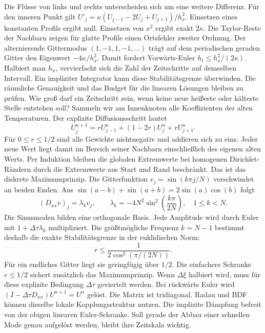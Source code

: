 \hypertarget{punkt7-2-1}{}
Die Flüsse von links und rechts unterscheiden sich um eine weitere Differenz. Für den inneren Punkt gilt \(U'_j=\kappa(U_{j-1}-2U_j+U_{j+1})/h_x^2\). Einsetzen eines konstanten Profils ergibt null. Einsetzen von \(x^2\) ergibt exakt \(2\kappa\). Die Taylor-Reste der Nachbarn zeigen für glatte Profile einen Ortsfehler zweiter Ordnung.
\hypertarget{punkt7-2-2}{}
Der alternierende Gittermodus \((1,-1,1,-1,\ldots)\) trägt auf dem periodischen geraden Gitter den Eigenwert \(-4\kappa/h_x^2\). Damit fordert Vorwärts-Euler \(h_t\le h_x^2/(2\kappa)\). Halbiert man \(h_x\), vervierfacht sich die Zahl der Zeitschritte auf demselben Intervall. Ein impliziter Integrator kann diese Stabilitätsgrenze überwinden. Die räumliche Genauigkeit und das Budget für die linearen Lösungen bleiben zu prüfen.
Wie groß darf ein Zeitschritt sein, wenn keine neue heißeste oder kälteste Stelle entstehen soll? Sammeln wir am Innenknoten alle Koeffizienten der alten Temperaturen. Der explizite Diffusionsschritt lautet
\[
 U_j^{n+1}=rU_{j-1}^n+(1-2r)U_j^n+rU_{j+1}^n .
\]
Für \(0\le r\le1/2\) sind alle Gewichte nichtnegativ und addieren sich zu eins. Jeder neue Wert liegt damit im Bereich seiner Nachbarn einschließlich des eigenen alten Werts. Per Induktion bleiben die globalen Extremwerte bei homogenen Dirichlet-Rändern durch die Extremwerte aus Start und Rand beschränkt. Das ist das diskrete Maximumprinzip.
Die Gitterfunktion \(v_j=\sin(k\pi j/N)\) verschwindet an beiden Enden. Aus \(\sin(a-b)+\sin(a+b)=2\sin(a)\cos(b)\) folgt
\[
 (D_{xx}v)_j=\lambda_k v_j,\qquad
 \lambda_k=-4N^2\sin^2\!\left(\frac{k\pi}{2N}\right),\quad 1\le k<N.
\]
Die Sinusmoden bilden eine orthogonale Basis. Jede Amplitude wird durch Euler mit \(1+\Delta\tau\lambda_k\) multipliziert. Die größtmögliche Frequenz \(k=N-1\) bestimmt deshalb die exakte Stabilitätsgrenze in der euklidischen Norm:
\[
 r\le\frac{1}{2\cos^2(\pi/(2N))}.
\]
Für ein endliches Gitter liegt sie geringfügig über \(1/2\). Die einfachere Schranke \(r\le1/2\) sichert zusätzlich das Maximumprinzip. Wenn \(\Delta\xi\) halbiert wird, muss für diese explizite Bedingung \(\Delta\tau\) geviertelt werden.
Bei rückwärts Euler wird \((I-\Delta\tau D_{xx})U^{n+1}=U^n\) gelöst. Die Matrix ist tridiagonal. Radau und BDF können dieselbe lokale Kopplungsstruktur nutzen. Die implizite Dämpfung befreit von der obigen linearen Euler-Schranke. Soll gerade der Abbau einer schnellen Mode genau aufgelöst werden, bleibt ihre Zeitskala wichtig.

